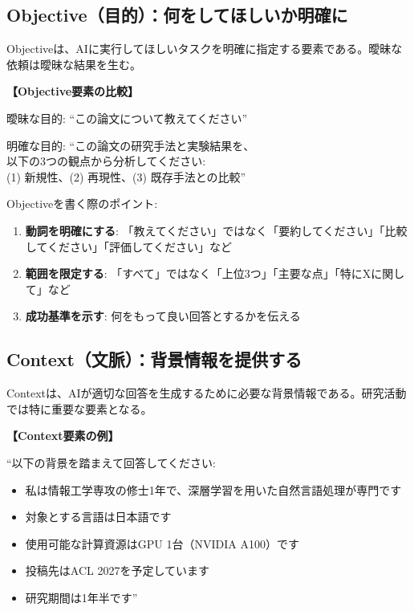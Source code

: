 \subsection{Objective（目的）：何をしてほしいか明確に}

Objectiveは、AIに実行してほしいタスクを明確に指定する要素である。曖昧な依頼は曖昧な結果を生む。

\begin{promptbox}
\textbf{【Objective要素の比較】}

曖昧な目的: ``この論文について教えてください''

明確な目的: ``この論文の研究手法と実験結果を、\\
以下の3つの観点から分析してください:\\
(1) 新規性、(2) 再現性、(3) 既存手法との比較''
\end{promptbox}

Objectiveを書く際のポイント:
\begin{enumerate}
\item \textbf{動詞を明確にする}: 「教えてください」ではなく「要約してください」「比較してください」「評価してください」など
\item \textbf{範囲を限定する}: 「すべて」ではなく「上位3つ」「主要な点」「特にXに関して」など
\item \textbf{成功基準を示す}: 何をもって良い回答とするかを伝える
\end{enumerate}

\subsection{Context（文脈）：背景情報を提供する}

Contextは、AIが適切な回答を生成するために必要な背景情報である。研究活動では特に重要な要素となる。

\begin{promptbox}
\textbf{【Context要素の例】}

``以下の背景を踏まえて回答してください:
\begin{itemize}
\item 私は情報工学専攻の修士1年で、深層学習を用いた自然言語処理が専門です
\item 対象とする言語は日本語です
\item 使用可能な計算資源はGPU 1台（NVIDIA A100）です
\item 投稿先はACL 2027を予定しています
\item 研究期間は1年半です''
\end{itemize}
\end{promptbox}

